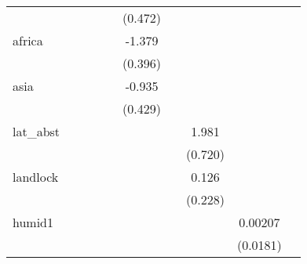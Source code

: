 {\begin{tabular}{l*{9}{c}}
            &                     &                     &                     &                     &     (0.472)         &                     &                     &                     &                     \\
[1em]
africa      &                     &                     &                     &                     &      -1.379\sym{***}&                     &                     &                     &                     \\
            &                     &                     &                     &                     &     (0.396)         &                     &                     &                     &                     \\
[1em]
asia        &                     &                     &                     &                     &      -0.935\sym{*}  &                     &                     &                     &                     \\
            &                     &                     &                     &                     &     (0.429)         &                     &                     &                     &                     \\
[1em]
lat\_abst    &                     &                     &                     &                     &                     &                     &       1.981\sym{**} &                     &                     \\
            &                     &                     &                     &                     &                     &                     &     (0.720)         &                     &                     \\
[1em]
landlock    &                     &                     &                     &                     &                     &                     &       0.126         &                     &                     \\
            &                     &                     &                     &                     &                     &                     &     (0.228)         &                     &                     \\
[1em]
humid1      &                     &                     &                     &                     &                     &                     &                     &     0.00207         &                     \\
            &                     &                     &                     &                     &                     &                     &                     &    (0.0181)         &                     \\

\end{tabular}}

